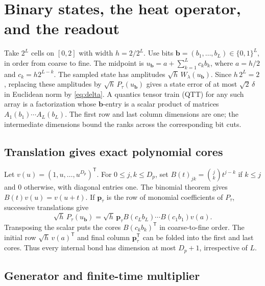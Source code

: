 \documentclass[11pt]{article}
\newcommand{\bits}{\{0,1\}^L}
\begin{document}
\section{Binary states, the heat operator, and the readout}
\label{sec:tensors}

Take \(2^L\) cells on \([0,2]\) with width \(h=2/2^L\). Use bits
\(\boldsymbol b=(b_1,\dots,b_L)\in\bits\), in order from coarse
to fine. The midpoint is \(u_{\boldsymbol b}=a+\sum_{k=1}^L c_k b_k\),
where \(a=h/2\) and \(c_k=h2^{L-k}\).
The sampled state has amplitudes \(\sqrt h\,W_\lambda(u_{\boldsymbol b})\).
Since \(h\,2^L=2\), replacing these amplitudes by
\(\sqrt h\,P_\tau(u_{\boldsymbol b})\) gives a state error of at most
\(\sqrt{2}\,\delta\) in Euclidean norm by \eqref{eq:delta}.
A quantics tensor train (QTT) for any such array is a factorization
whose \(\boldsymbol b\)-entry is a scalar product of matrices
\(A_1(b_1)\cdots A_L(b_L)\). The first row and last column dimensions
are one; the intermediate dimensions bound the ranks across the
corresponding bit cuts.

\subsection{Translation gives exact polynomial cores}

Let \(v(u)=(1,u,\ldots,u^{D_p})^{\mathsf T}\).
For \(0\le j,k\le D_p\), set \(B(t)_{jk}=\binom jk t^{j-k}\)
if \(k\le j\) and \(0\) otherwise, with diagonal entries one.
The binomial theorem gives \(B(t)v(u)=v(u+t)\). If
\(\boldsymbol p_\tau\) is the row of monomial coefficients of \(P_\tau\),
successive translations give
\[
 \sqrt h\,P_\tau(u_{\boldsymbol b})
   =\sqrt h\,\boldsymbol p_\tau
     B(c_Lb_L)\cdots B(c_1b_1)v(a).
\]
Transposing the scalar puts the cores \(B(c_kb_k)^{\mathsf T}\)
in coarse-to-fine order. The initial row \(\sqrt h\,v(a)^{\mathsf T}\)
and final column \(\boldsymbol p_\tau^{\mathsf T}\) can be folded into
the first and last cores. Thus every internal bond has dimension
at most \(D_p+1\), irrespective of \(L\).

\subsection{Generator and finite-time multiplier}
\end{document}
